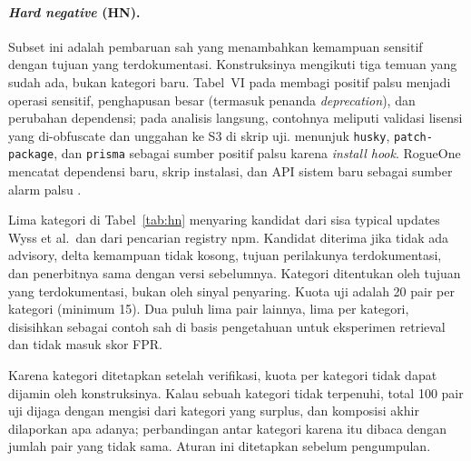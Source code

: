 \documentclass[a4paper,fleqn]{cas-dc}
\begin{document}
\paragraph{\emph{Hard negative} (HN).}
Subset ini adalah pembaruan sah yang menambahkan kemampuan sensitif dengan
tujuan yang terdokumentasi. Konstruksinya mengikuti tiga temuan yang sudah ada,
bukan kategori baru. Tabel~VI pada \citet{wyss2025evaluating} membagi positif palsu menjadi
operasi sensitif, penghapusan besar (termasuk penanda \emph{deprecation}), dan
perubahan dependensi; pada analisis langsung, contohnya meliputi validasi
lisensi yang di-obfuscate dan unggahan ke S3 di skrip uji.
\citet{guo2026effective} menunjuk \texttt{husky}, \texttt{patch-package}, dan
\texttt{prisma} sebagai sumber positif palsu karena \emph{install hook}.
RogueOne mencatat dependensi baru, skrip instalasi, dan API sistem baru sebagai
sumber alarm palsu \citep{sofaer2024rogueone}.

Lima kategori di Tabel~\ref{tab:hn} menyaring kandidat dari sisa typical
updates Wyss et al.\ dan dari pencarian registry npm. Kandidat diterima jika
tidak ada advisory, delta kemampuan tidak kosong, tujuan perilakunya
terdokumentasi, dan penerbitnya sama dengan versi sebelumnya. Kategori
ditentukan oleh tujuan yang terdokumentasi, bukan oleh sinyal penyaring.
Kuota uji adalah 20 pair per kategori (minimum 15). Dua puluh lima pair
lainnya, lima per kategori, disisihkan sebagai contoh sah di basis pengetahuan
untuk eksperimen retrieval dan tidak masuk skor FPR.

Karena kategori ditetapkan setelah verifikasi, kuota per kategori tidak dapat
dijamin oleh konstruksinya. Kalau sebuah kategori tidak terpenuhi, total 100
pair uji dijaga dengan mengisi dari kategori yang surplus, dan komposisi akhir
dilaporkan apa adanya; perbandingan antar kategori karena itu dibaca dengan
jumlah pair yang tidak sama. Aturan ini ditetapkan sebelum pengumpulan.
\end{document}
